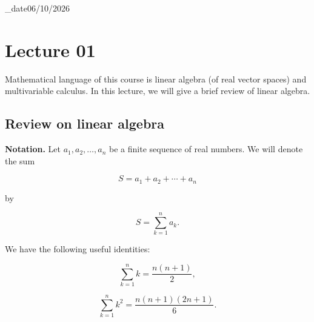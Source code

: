 \lecture_date{06/10/2026}
\chapter{Lecture 01}

Mathematical language of this course is linear algebra (of real vector spaces) and multivariable calculus. In this lecture, we will give a brief review of linear algebra.

\section{Review on linear algebra}

\textbf{Notation.} Let \( a_1, a_2, \ldots, a_n \) be a finite sequence of real numbers. We will denote the sum

\begin{equation}
	S = a_1 + a_2 + \cdots + a_n
	\label{eq:lecture-01-1}
\end{equation}

by

\begin{equation}
	S = \sum_{k=1}^{n} a_k.
	\label{eq:lecture-01-2}
\end{equation}

We have the following useful identities:

\begin{equation}
	\sum_{k=1}^{n} k = \frac{n(n+1)}{2},
	\label{eq:lecture-01-3}
\end{equation}

\begin{equation}
	\sum_{k=1}^{n} k^2 = \frac{n(n+1)(2n+1)}{6}.
	\label{eq:lecture-01-4}
\end{equation}

